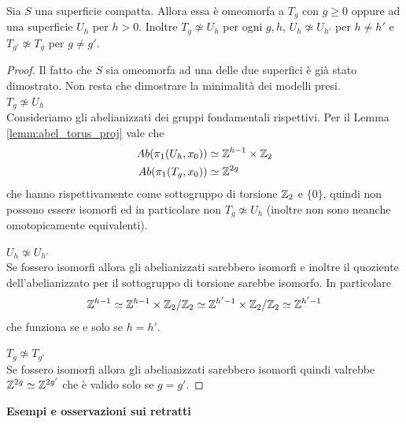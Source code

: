 \begin{theorem}
	Sia $S$ una superficie compatta. Allora essa è omeomorfa a $T_g$ con $g\ge 0$ oppure ad una superficie $U_h$ per $h > 0$. Inoltre $T_g \not\simeq U_h$ per ogni $g,h$, $U_h \not\simeq U_{h'}$ per $h\neq h'$ e $T_{g'} \not\simeq T_g$ per $g \neq g'$.
\end{theorem}
\begin{proof}
	Il fatto che $S$ sia omeomorfa ad una delle due superfici è già stato dimostrato. Non resta che dimostrare la minimalità dei modelli presi.\\
	
	\textbf{$T_g \not\simeq U_h$}\\
	
	Consideriamo gli abelianizzati dei gruppi fondamentali rispettivi. Per il Lemma \ref{lemm:abel_torus_proj} vale che 
	\begin{equation}
	\begin{aligned}
		Ab(\pi_1(U_h, x_0)) & \simeq \mathbb{Z}^{h-1} \times \mathbb{Z}_2 \\
		Ab(\pi_1(T_g, x_0)) & \simeq \mathbb{Z}^{2g}
	\end{aligned}
	\end{equation}
	che hanno rispettivamente come sottogruppo di torsione $\mathbb{Z}_2$ e $\{0\}$, quindi non possono essere isomorfi ed in particolare non $T_g \not\simeq U_h$ (inoltre non sono neanche omotopicamente equivalenti).
	
	\textbf{$U_h \not\simeq U_{h'}$} \\
	
	Se fossero isomorfi allora gli abelianizzati sarebbero isomorfi e inoltre il quoziente dell'abelianizzato per il sottogruppo di torsione sarebbe isomorfo. In particolare 
	\begin{equation}
	\begin{aligned}
		\mathbb{Z}^{h-1} \simeq \mathbb{Z}^{h-1} \times \mathbb{Z}_2 / \mathbb{Z}_2 \simeq \mathbb{Z}^{h'-1} \times \mathbb{Z}_2 / \mathbb{Z}_2 \simeq \mathbb{Z}^{h'-1}
	\end{aligned}
	\end{equation}
	che funziona se e solo se $h = h'$.
	
	\textbf{$T_g \not\simeq T_{g'}$} \\
	
	Se fossero isomorfi allora gli abelianizzati sarebbero isomorfi quindi valrebbe $\mathbb{Z}^{2g} \simeq \mathbb{Z}^{2g'}$ che è valido solo se $g = g'$.
\end{proof}


\textbf{Esempi e osservazioni sui retratti}\\
